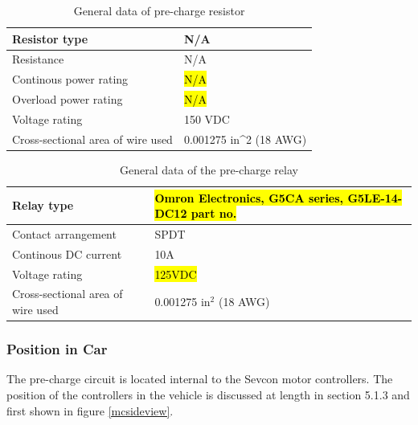 \documentclass{article}
\DeclareRobustCommand{\hlr}[1]{{\sethlcolor{red}\hl{#1}}}
\begin{document}
            \begin{table}[H]
                \centering
                \begin{tabular}{|l|l|}
                \hline
                Resistor type & N/A \\ \hline
                Resistance & N/A \\ \hline
                Continous power rating & \hlr{N/A} \\ \hline
                Overload power rating & \hlr{N/A} \\ \hline
                Voltage rating & 150 VDC \\ \hline
                Cross-sectional area of wire used & 0.001275 in\textasciicircum 2 (18 AWG) \\ \hline
                \end{tabular}
                \caption{General data of pre-charge resistor }
                \label{prechargeresistor}
            \end{table}


            \begin{table}[H]
                \centering
                \begin{tabular}{|l|l|}
                \hline
                Relay type & \hlr{Omron Electronics, G5CA series, G5LE-14-DC12 part no.} \\ \hline
                Contact arrangement & SPDT \\ \hline
                Continous DC current & 10A \\ \hline
                Voltage rating & \hlr{125VDC} \\ \hline
                Cross-sectional area of wire used & 0.001275 in$^{2}$ (18 AWG) \\ \hline
                \end{tabular}
                \caption{General data of the pre-charge relay}
                \label{PCrelay}
            \end{table}

        \subsubsection{Position in Car}

            The pre-charge circuit is located internal to the Sevcon motor controllers. The position of the controllers in the vehicle is discussed at length in section 5.1.3 and first shown in figure \ref{mcsideview}.
\end{document}
